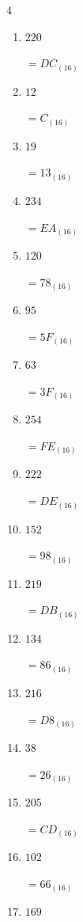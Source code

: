 \begin{multicols}{4}
\begin{enumerate}
  \item $220$

        $=DC_{(16)}$

  \item $12$

        $=C_{(16)}$

  \item $19$

        $=13_{(16)}$

  \item $234$

        $=EA_{(16)}$

  \item $120$

        $=78_{(16)}$

  \item $95$

        $=5F_{(16)}$

  \item $63$

        $=3F_{(16)}$

  \item $254$

        $=FE_{(16)}$

  \item $222$

        $=DE_{(16)}$

  \item $152$

        $=98_{(16)}$

\columnbreak %

  \item $219$

        $=DB_{(16)}$

  \item $134$

        $=86_{(16)}$

  \item $216$

        $=D8_{(16)}$

  \item $38$

        $=26_{(16)}$

  \item $205$

        $=CD_{(16)}$

  \item $102$

        $=66_{(16)}$

  \item $169$


\end{enumerate}
\end{multicols}
